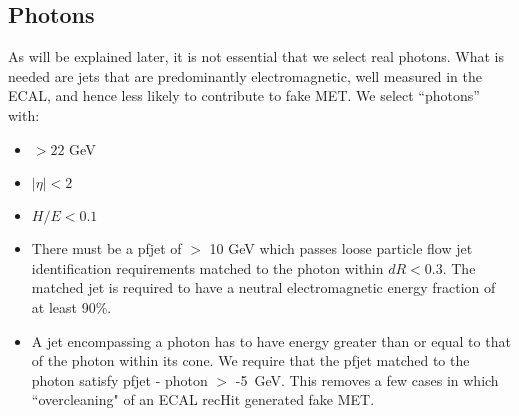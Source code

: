 \begin{itemize}

\end{itemize}


\subsection{Photons}

As will be explained later, it is not essential that we select real photons. 
What is needed are jets that are predominantly electromagnetic, well measured in the ECAL, and hence less likely to contribute to fake MET. We select ``photons'' with:

\begin{itemize}
\item \pt $ > 22$ GeV
\item $|\eta| < 2$
\item $H/E < 0.1$
\item There must be a pfjet of \pt $ >$ 10 GeV which passes loose particle flow jet identification requirements matched to the photon within $dR < 0.3$. The matched jet is required to have a neutral electromagnetic energy fraction of at least 
90\%.

\item A jet encompassing a photon has to have energy greater than or equal to that of the photon within its cone. We require that the pfjet \pt matched to the photon satisfy pfjet \pt - photon \pt $>$ -5~GeV. This removes a few cases in which ``overcleaning" of an ECAL recHit generated fake MET.

\end{itemize}

